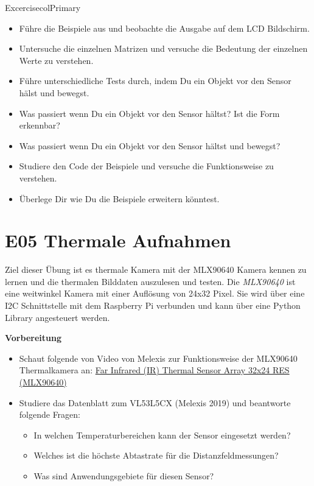 \documentclass[
  11pt,
  a4paper,
  oneside, openany  ,captions=tableheading
]{scrbook}
\providecommand{\tightlist}{%
  \setlength{\itemsep}{0pt}\setlength{\parskip}{0pt}}
\theoremstyle{remark}
\begin{document}
\begin{boxtitle}{Excercise}{colPrimary}

\begin{itemize}
\tightlist
\item
  Führe die Beispiele aus und beobachte die Ausgabe auf dem LCD
  Bildschirm.
\item
  Untersuche die einzelnen Matrizen und versuche die Bedeutung der
  einzelnen Werte zu verstehen.
\item
  Führe unterschiedliche Tests durch, indem Du ein Objekt vor den Sensor
  hälst und bewegst.
\item
  Was passiert wenn Du ein Objekt vor den Sensor hältst? Ist die Form
  erkennbar?
\item
  Was passiert wenn Du ein Objekt vor den Sensor hältst und bewegst?
\item
  Studiere den Code der Beispiele und versuche die Funktionsweise zu
  verstehen.
\item
  Überlege Dir wie Du die Beispiele erweitern könntest.
\end{itemize}

\end{boxtitle}

\chapter*{E05 Thermale Aufnahmen}\label{e05-thermale-aufnahmen}


Ziel dieser Übung ist es thermale Kamera mit der MLX90640 Kamera kennen
zu lernen und die thermalen Bilddaten auszulesen und testen. Die
\emph{MLX90640} ist eine weitwinkel Kamera mit einer Auflösung von 24x32
Pixel. Sie wird über eine I2C Schnittstelle mit dem Raspberry Pi
verbunden und kann über eine Python Library angesteuert werden.

\textbf{Vorbereitung}

\begin{itemize}
\tightlist
\item
  Schaut folgende von Video von Melexis zur Funktionsweise der MLX90640
  Thermalkamera an:
  \href{https://www.youtube.com/embed/WSZ3GGDusTk?si=WTfxZ3m2axljCwDG}{Far
  Infrared (IR) Thermal Sensor Array 32x24 RES (MLX90640)}
\item
  Studiere das Datenblatt zum VL53L5CX (Melexis 2019) und beantworte
  folgende Fragen:

  \begin{itemize}
  \tightlist
  \item
    In welchen Temperaturbereichen kann der Sensor eingesetzt werden?
  \item
    Welches ist die höchste Abtastrate für die Distanzfeldmessungen?
  \item
    Was sind Anwendungsgebiete für diesen Sensor?
  \end{itemize}
\end{itemize}
\end{document}
